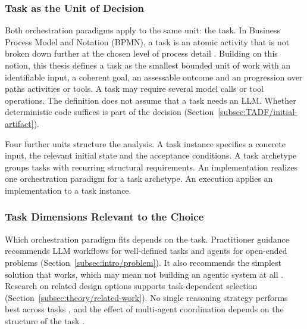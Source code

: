 \subsubsection{Task as the Unit of Decision}
\label{subsubsec:theory/task}

Both orchestration paradigms apply to the same unit: the task. In Business Process Model and Notation (BPMN), a task is an atomic activity that is not broken down further at the chosen level of process detail \parencite{BPMN}. Building on this notion, this thesis defines a task as the smallest bounded unit of work with an identifiable input, a coherent goal, an assessable outcome and an progression over paths activities or tools. A task may require several model calls or tool operations. The definition does not assume that a task needs an LLM. Whether deterministic code suffices is part of the decision (Section~\ref{subsec:TADF/initial-artifact}).

Four further units structure the analysis. A task instance specifies a concrete input, the relevant initial state and the acceptance conditions. A task archetype groups tasks with recurring structural requirements. An implementation realizes one orchestration paradigm for a task archetype. An execution applies an implementation to a task instance.

\subsubsection{Task Dimensions Relevant to the Choice}
\label{subsubsec:theory/importance}
Which orchestration paradigm fits depends on the task. Practitioner guidance recommends LLM workflows for well-defined tasks and agents for open-ended problems (Section~\ref{subsec:intro/problem}). It also recommends the simplest solution that works, which may mean not building an agentic system at all \parencite{schluntzBuildingEffectiveAI2024}. Research on related design options supports task-dependent selection (Section~\ref{subsec:theory/related-work}). No single reasoning strategy performs best across tasks \parencite{zhouSelectthenSolveParadigmRouting2026}, and the effect of multi-agent coordination depends on the structure of the task \parencite{kimScienceScalingAgent2025}.

